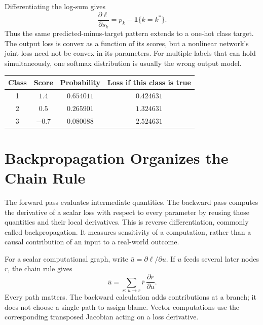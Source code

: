 Differentiating the log-sum gives
\[
\frac{\partial\ell}{\partial s_k}=p_k-\mathbf1\{k=k^*\}.
\]
Thus the same predicted-minus-target pattern extends to a one-hot class target. The output loss is convex as a function of its scores, but a nonlinear network's joint loss need not be convex in its parameters. For multiple labels that can hold simultaneously, one softmax distribution is usually the wrong output model.

\par\addvspace{\intextsep}\noindent\begin{minipage}{\linewidth}
\centering\small
\begin{tabular}{@{}cccc@{}}
\toprule
Class & Score & Probability & Loss if this class is true \\
\midrule
1 & $1.4$ & $0.654011$ & $0.424631$ \\
2 & $0.5$ & $0.265901$ & $1.324631$ \\
3 & $-0.7$ & $0.080088$ & $2.524631$ \\
\bottomrule
\end{tabular}
\label{tab:softmax-example}
\end{minipage}\par\addvspace{\intextsep}

\section{Backpropagation Organizes the Chain Rule}

The forward pass evaluates intermediate quantities. The backward pass computes the derivative of a scalar loss with respect to every parameter by reusing those quantities and their local derivatives. This is reverse differentiation, commonly called backpropagation. It measures sensitivity of a computation, rather than a causal contribution of an input to a real-world outcome.

For a scalar computational graph, write $\bar u=\partial\ell/\partial u$. If $u$ feeds several later nodes $r$, the chain rule gives
\[
\bar u=\sum_{r:\,u\to r}\bar r\,\frac{\partial r}{\partial u}.
\]
Every path matters. The backward calculation adds contributions at a branch; it does not choose a single path to assign blame. Vector computations use the corresponding transposed Jacobian acting on a loss derivative.

